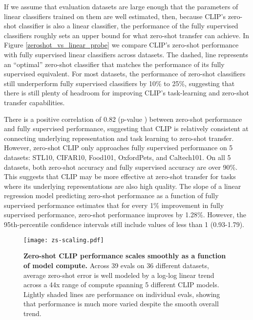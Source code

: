 \documentclass{article}
\begin{document}
If we assume that evaluation datasets are large enough that the parameters of linear classifiers trained on them are well estimated, then, because CLIP's zero-shot classifier is also a linear classifier, the performance of the fully supervised classifiers roughly sets an upper bound for what zero-shot transfer can achieve. In Figure \ref{zeroshot_vs_linear_probe} we compare CLIP's zero-shot performance with fully supervised linear classifiers across datasets. The dashed,  line represents an ``optimal'' zero-shot classifier that matches the performance of its fully supervised equivalent. For most datasets, the performance of zero-shot classifiers still underperform fully supervised classifiers by 10\% to 25\%, suggesting that there is still plenty of headroom for improving CLIP's task-learning and zero-shot transfer capabilities.

There is a positive correlation of 0.82 (p-value ) between zero-shot performance and fully supervised performance, suggesting that CLIP is relatively consistent at connecting underlying representation and task learning to zero-shot transfer. However, zero-shot CLIP only approaches fully supervised performance on 5 datasets: STL10, CIFAR10, Food101, OxfordPets, and Caltech101. On all 5 datasets, both zero-shot accuracy and fully supervised accuracy are over 90\%. This suggests that CLIP may be more effective at zero-shot transfer for tasks where its underlying representations are also high quality. The slope of a linear regression model predicting zero-shot performance as a function of fully supervised performance estimates that for every 1\% improvement in fully supervised performance, zero-shot performance improves by 1.28\%. However, the 95th-percentile confidence intervals still include values of less than 1 (0.93-1.79).



\begin{figure}[t]
\begin{center}
\centerline{\texttt{[image: zs-scaling.pdf]}}
\caption{\textbf{Zero-shot CLIP performance scales smoothly as a function of model compute.} Across 39 evals on 36 different datasets, average zero-shot error is well modeled by a log-log linear trend across a 44x range of compute spanning 5 different CLIP models. Lightly shaded lines are performance on individual evals, showing that performance is much more varied despite the smooth overall trend.}
\label{zeroshot_scaling}
\end{center}
\vspace{-2em}
\end{figure}
\end{document}
